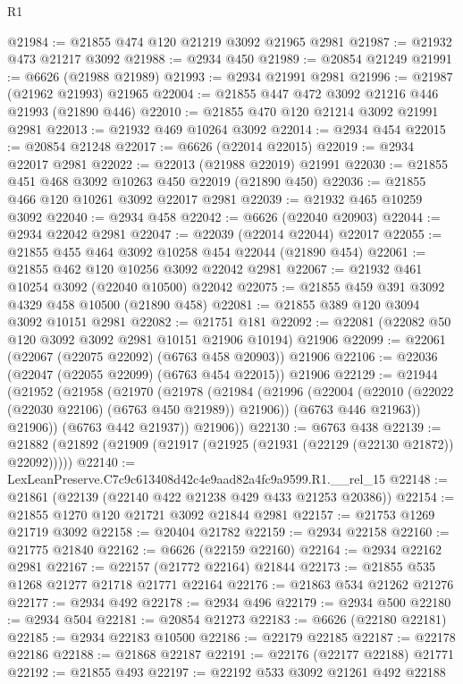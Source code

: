 \begin{lexlean}{R1}
\begin{coremodule}
@21984 := @21855 @474 @120 @21219 @3092 @21965 @2981
@21987 := @21932 @473 @21217 @3092
@21988 := @2934 @450
@21989 := @20854 @21249
@21991 := @6626 (@21988 @21989)
@21993 := @2934 @21991 @2981
@21996 := @21987 (@21962 @21993) @21965
@22004 := @21855 @447 @472 @3092 @21216 @446 @21993 (@21890 @446)
@22010 := @21855 @470 @120 @21214 @3092 @21991 @2981
@22013 := @21932 @469 @10264 @3092
@22014 := @2934 @454
@22015 := @20854 @21248
@22017 := @6626 (@22014 @22015)
@22019 := @2934 @22017 @2981
@22022 := @22013 (@21988 @22019) @21991
@22030 := @21855 @451 @468 @3092 @10263 @450 @22019 (@21890 @450)
@22036 := @21855 @466 @120 @10261 @3092 @22017 @2981
@22039 := @21932 @465 @10259 @3092
@22040 := @2934 @458
@22042 := @6626 (@22040 @20903)
@22044 := @2934 @22042 @2981
@22047 := @22039 (@22014 @22044) @22017
@22055 := @21855 @455 @464 @3092 @10258 @454 @22044 (@21890 @454)
@22061 := @21855 @462 @120 @10256 @3092 @22042 @2981
@22067 := @21932 @461 @10254 @3092 (@22040 @10500) @22042
@22075 := @21855 @459 @391 @3092 @4329 @458 @10500 (@21890 @458)
@22081 := @21855 @389 @120 @3094 @3092 @10151 @2981
@22082 := @21751 @181
@22092 := @22081 (@22082 @50 @120 @3092 @3092 @2981 @10151 @21906 @10194) @21906
@22099 := @22061 (@22067 (@22075 @22092) (@6763 @458 @20903)) @21906
@22106 := @22036 (@22047 (@22055 @22099) (@6763 @454 @22015)) @21906
@22129 := @21944
    (@21952
      (@21958
        (@21970
          (@21978
            (@21984
              (@21996
                (@22004 (@22010 (@22022 (@22030 @22106) (@6763 @450 @21989)) @21906))
                (@6763 @446 @21963))
              @21906))
          (@6763 @442 @21937))
        @21906))
@22130 := @6763 @438
@22139 := @21882 (@21892 (@21909 (@21917 (@21925 (@21931 (@22129 (@22130 @21872)) @22092)))))
@22140 := LexLeanPreserve.C7c9c613408d42c4e9aad82a4fc9a9599.R1.__rel_15
@22148 := @21861 (@22139 (@22140 @422 @21238 @429 @433 @21253 @20386))
@22154 := @21855 @1270 @120 @21721 @3092 @21844 @2981
@22157 := @21753 @1269 @21719 @3092
@22158 := @20404 @21782
@22159 := @2934 @22158
@22160 := @21775 @21840
@22162 := @6626 (@22159 @22160)
@22164 := @2934 @22162 @2981
@22167 := @22157 (@21772 @22164) @21844
@22173 := @21855 @535 @1268 @21277 @21718 @21771 @22164
@22176 := @21863 @534 @21262 @21276
@22177 := @2934 @492
@22178 := @2934 @496
@22179 := @2934 @500
@22180 := @2934 @504
@22181 := @20854 @21273
@22183 := @6626 (@22180 @22181)
@22185 := @2934 @22183 @10500
@22186 := @22179 @22185
@22187 := @22178 @22186
@22188 := @21868 @22187
@22191 := @22176 (@22177 @22188) @21771
@22192 := @21855 @493
@22197 := @22192 @533 @3092 @21261 @492 @22188

\end{coremodule}
\end{lexlean}
